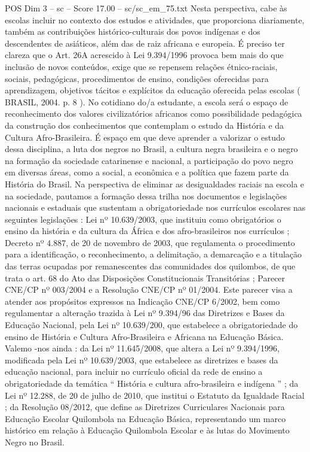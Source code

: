 \begin{textsample}{POS Dim 3 – sc – Score 17.00 – sc/sc\_em\_75.txt}
Nesta perspectiva, cabe às escolas incluir no contexto dos estudos e atividades, que proporciona diariamente, também as contribuições histórico-culturais dos povos indígenas e dos descendentes de asiáticos, além das de raiz africana e europeia.
É preciso ter clareza que o Art. 26A acrescido à Lei 9.394/1996 provoca bem mais do que inclusão de novos conteúdos, exige que se repensem relações étnico-raciais, sociais, pedagógicas, procedimentos de ensino, condições oferecidas para aprendizagem, objetivos tácitos e explícitos da educação oferecida pelas escolas ( BRASIL, 2004. p. 8 ).
No cotidiano do/a estudante, a escola será o espaço de reconhecimento dos valores civilizatórios africanos como possibilidade pedagógica da construção dos conhecimentos que contemplam o estudo da História e da Cultura Afro-Brasileira.
É espaço em que deve aprender a valorizar o estudo dessa disciplina, a luta dos negros no Brasil, a cultura negra brasileira e o negro na formação da sociedade catarinense e nacional, a participação do povo negro em diversas áreas, como a social, a econômica e a política que fazem parte da História do Brasil.
Na perspectiva de eliminar as desigualdades raciais na escola e na sociedade, pautamos a formação dessa trilha nos documentos e legislações nacionais e estaduais que sustentam a obrigatoriedade nos currículos escolares nas seguintes legislações : Lei nº 10.639/2003, que instituiu como obrigatórios o ensino da história e da cultura da África e dos afro-brasileiros nos currículos ; Decreto nº 4.887, de 20 de novembro de 2003, que regulamenta o procedimento para a identificação, o reconhecimento, a delimitação, a demarcação e a titulação das terras ocupadas por remanescentes das comunidades dos quilombos, de que trata o art. 68 do Ato das Disposições Constitucionais Transitórias ; Parecer CNE/CP nº 003/2004 e a Resolução CNE/CP nº 01/2004.
Este parecer visa a atender aos propósitos expressos na Indicação CNE/CP 6/2002, bem como regulamentar a alteração trazida à Lei nº 9.394/96 das Diretrizes e Bases da Educação Nacional, pela Lei nº 10.639/200, que estabelece a obrigatoriedade do ensino de História e Cultura Afro-Brasileira e Africana na Educação Básica.
Valemo -nos ainda : da Lei nº 11.645/2008, que altera a Lei nº 9.394/1996, modificada pela Lei nº 10.639/2003, que estabelece as diretrizes e bases da educação nacional, para incluir no currículo oficial da rede de ensino a obrigatoriedade da temática “ História e cultura afro-brasileira e indígena ” ; da Lei nº 12.288, de 20 de julho de 2010, que institui o Estatuto da Igualdade Racial ; da Resolução 08/2012, que define as Diretrizes Curriculares Nacionais para Educação Escolar Quilombola na Educação Básica, representando um marco histórico em relação à Educação Quilombola Escolar e às lutas do Movimento Negro no Brasil.

\end{textsample}
